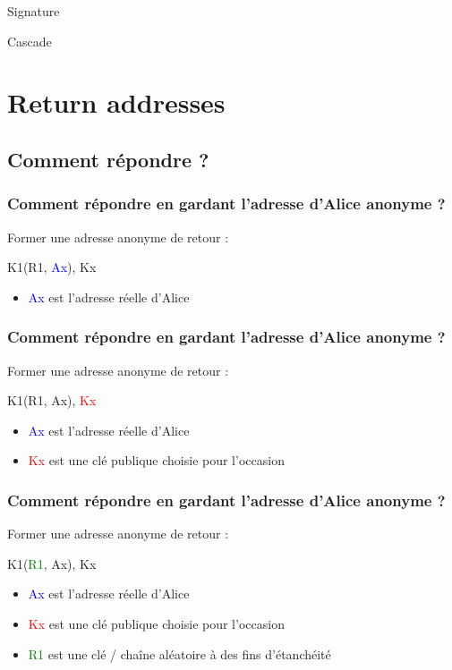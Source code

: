 \documentclass{beamer}
\begin{document}
\begin{frame}
Signature
\end{frame}

\begin{frame}
Cascade
\end{frame}


\section{Return addresses}
\subsection{Comment répondre ?}
\begin{frame}
\frametitle{Comment répondre en gardant l'adresse d'Alice anonyme ?}
Former une adresse anonyme de retour :
\begin{center}
K1(R1, \textcolor{blue}{Ax}), Kx
\end{center}
\begin{itemize}
[triangle]
\item \textcolor{blue}{Ax} est l'adresse réelle d'Alice
\end{itemize}
\end{frame}

\begin{frame}
\frametitle{Comment répondre en gardant l'adresse d'Alice anonyme ?}
Former une adresse anonyme de retour :
\begin{center}
K1(R1, Ax), \textcolor{red}{Kx}
\end{center}
\begin{itemize}
[triangle]
\item \textcolor{blue}{Ax} est l'adresse réelle d'Alice
\item \textcolor{red}{Kx} est une clé publique choisie pour l'occasion
\end{itemize}
\end{frame}

\begin{frame}
\frametitle{Comment répondre en gardant l'adresse d'Alice anonyme ?}
Former une adresse anonyme de retour :
\begin{center}
K1(\textcolor{green}{R1}, Ax), Kx
\end{center}
\begin{itemize}
[triangle]
\item \textcolor{blue}{Ax} est l'adresse réelle d'Alice
\item \textcolor{red}{Kx} est une clé publique choisie pour l'occasion
\item \textcolor{green}{R1} est une clé / chaîne aléatoire à des fins d'étanchéité
\end{itemize}
\end{frame}
\end{document}
